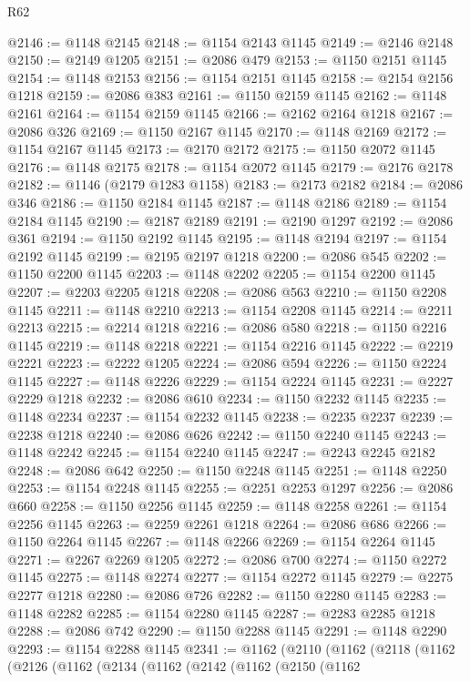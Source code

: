 \begin{lexlean}{R62}
\begin{coremodule}
@2146 := @1148 @2145
@2148 := @1154 @2143 @1145
@2149 := @2146 @2148
@2150 := @2149 @1205
@2151 := @2086 @479
@2153 := @1150 @2151 @1145
@2154 := @1148 @2153
@2156 := @1154 @2151 @1145
@2158 := @2154 @2156 @1218
@2159 := @2086 @383
@2161 := @1150 @2159 @1145
@2162 := @1148 @2161
@2164 := @1154 @2159 @1145
@2166 := @2162 @2164 @1218
@2167 := @2086 @326
@2169 := @1150 @2167 @1145
@2170 := @1148 @2169
@2172 := @1154 @2167 @1145
@2173 := @2170 @2172
@2175 := @1150 @2072 @1145
@2176 := @1148 @2175
@2178 := @1154 @2072 @1145
@2179 := @2176 @2178
@2182 := @1146 (@2179 @1283 @1158)
@2183 := @2173 @2182
@2184 := @2086 @346
@2186 := @1150 @2184 @1145
@2187 := @1148 @2186
@2189 := @1154 @2184 @1145
@2190 := @2187 @2189
@2191 := @2190 @1297
@2192 := @2086 @361
@2194 := @1150 @2192 @1145
@2195 := @1148 @2194
@2197 := @1154 @2192 @1145
@2199 := @2195 @2197 @1218
@2200 := @2086 @545
@2202 := @1150 @2200 @1145
@2203 := @1148 @2202
@2205 := @1154 @2200 @1145
@2207 := @2203 @2205 @1218
@2208 := @2086 @563
@2210 := @1150 @2208 @1145
@2211 := @1148 @2210
@2213 := @1154 @2208 @1145
@2214 := @2211 @2213
@2215 := @2214 @1218
@2216 := @2086 @580
@2218 := @1150 @2216 @1145
@2219 := @1148 @2218
@2221 := @1154 @2216 @1145
@2222 := @2219 @2221
@2223 := @2222 @1205
@2224 := @2086 @594
@2226 := @1150 @2224 @1145
@2227 := @1148 @2226
@2229 := @1154 @2224 @1145
@2231 := @2227 @2229 @1218
@2232 := @2086 @610
@2234 := @1150 @2232 @1145
@2235 := @1148 @2234
@2237 := @1154 @2232 @1145
@2238 := @2235 @2237
@2239 := @2238 @1218
@2240 := @2086 @626
@2242 := @1150 @2240 @1145
@2243 := @1148 @2242
@2245 := @1154 @2240 @1145
@2247 := @2243 @2245 @2182
@2248 := @2086 @642
@2250 := @1150 @2248 @1145
@2251 := @1148 @2250
@2253 := @1154 @2248 @1145
@2255 := @2251 @2253 @1297
@2256 := @2086 @660
@2258 := @1150 @2256 @1145
@2259 := @1148 @2258
@2261 := @1154 @2256 @1145
@2263 := @2259 @2261 @1218
@2264 := @2086 @686
@2266 := @1150 @2264 @1145
@2267 := @1148 @2266
@2269 := @1154 @2264 @1145
@2271 := @2267 @2269 @1205
@2272 := @2086 @700
@2274 := @1150 @2272 @1145
@2275 := @1148 @2274
@2277 := @1154 @2272 @1145
@2279 := @2275 @2277 @1218
@2280 := @2086 @726
@2282 := @1150 @2280 @1145
@2283 := @1148 @2282
@2285 := @1154 @2280 @1145
@2287 := @2283 @2285 @1218
@2288 := @2086 @742
@2290 := @1150 @2288 @1145
@2291 := @1148 @2290
@2293 := @1154 @2288 @1145
@2341 := @1162
    (@2110
      (@1162
        (@2118
          (@1162
            (@2126
              (@1162
                (@2134
                  (@1162
                    (@2142
                      (@1162
                        (@2150
                          (@1162

\end{coremodule}
\end{lexlean}
